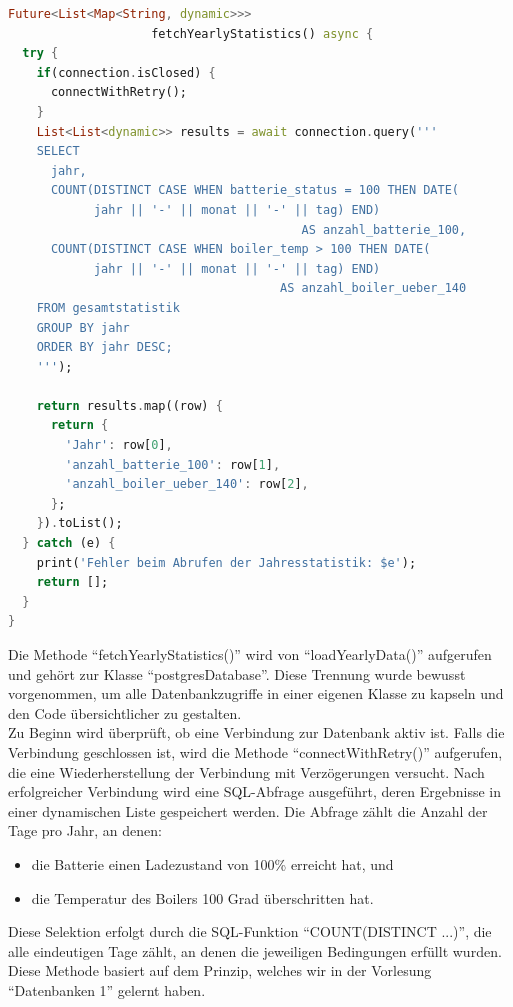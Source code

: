 \documentclass{article}
\begin{document}
    \begin{lstlisting}[language=Dart]
Future<List<Map<String, dynamic>>>
                    fetchYearlyStatistics() async {
  try {
    if(connection.isClosed) {
      connectWithRetry();
    }
    List<List<dynamic>> results = await connection.query('''
    SELECT
      jahr,
      COUNT(DISTINCT CASE WHEN batterie_status = 100 THEN DATE(
            jahr || '-' || monat || '-' || tag) END)
                                         AS anzahl_batterie_100,
      COUNT(DISTINCT CASE WHEN boiler_temp > 100 THEN DATE(
            jahr || '-' || monat || '-' || tag) END)
                                      AS anzahl_boiler_ueber_140
    FROM gesamtstatistik
    GROUP BY jahr
    ORDER BY jahr DESC;
    ''');

    return results.map((row) {
      return {
        'Jahr': row[0],
        'anzahl_batterie_100': row[1],
        'anzahl_boiler_ueber_140': row[2],
      };
    }).toList();
  } catch (e) {
    print('Fehler beim Abrufen der Jahresstatistik: $e');
    return [];
  }
}
    \end{lstlisting}
    Die Methode \enquote{fetchYearlyStatistics()} wird von \enquote{loadYearlyData()} aufgerufen und gehört zur Klasse
    \enquote{postgresDatabase}.
    Diese Trennung wurde bewusst vorgenommen, um alle Datenbankzugriffe in einer eigenen Klasse zu kapseln und
    den Code übersichtlicher zu gestalten.  \\
    Zu Beginn wird überprüft, ob eine Verbindung zur Datenbank aktiv ist.
    Falls die Verbindung geschlossen ist, wird die Methode \enquote{connectWithRetry()} aufgerufen, die eine Wiederherstellung der
    Verbindung mit Verzögerungen versucht.
    Nach erfolgreicher Verbindung wird eine SQL-Abfrage ausgeführt, deren Ergebnisse in einer dynamischen Liste
    gespeichert werden.
    Die Abfrage zählt die Anzahl der Tage pro Jahr, an denen:
    \begin{itemize}
        \item die Batterie einen Ladezustand von 100\% erreicht hat, und
        \item die Temperatur des Boilers 100 Grad überschritten hat.
    \end{itemize}
    Diese Selektion erfolgt durch die SQL-Funktion \enquote{COUNT(DISTINCT ...)}, die alle eindeutigen Tage zählt, an
    denen die jeweiligen Bedingungen erfüllt wurden.
    Diese Methode basiert auf dem Prinzip, welches wir in der Vorlesung \enquote{Datenbanken 1} gelernt haben.
\end{document}
